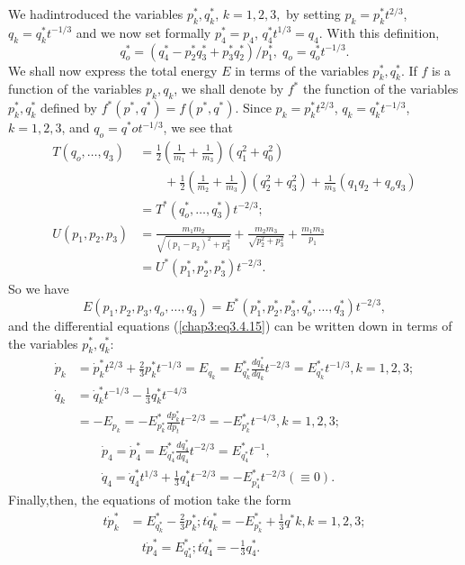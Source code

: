 We had\pageoriginale introduced the variables $p^*_k, q^*_k$, $k
=1,2,3,$ by setting $p_k = p^*_k t^{2/3}$, $q_k = q^*_k t^{-1/3}$ and
we now set formally $p^*_4 = p_4$, $q^*_4 t^{1/3} = q_4$. With this
definition, 
$$
q^*_o = (q^*_4 - p^*_2 q^*_3 + p^*_3 q^*_2) / p^*_1, \; q_o = q^*_o t^{-1/3}. 
$$
We shall now express the total energy $E$ in terms of the variables
$p^*_k, q^*_k$. If $f$ is a function of the variables $p_k, q_k$, we
shall denote by $f^*$ the function of the variables $p^*_k, q^*_k$
defined by $f^*(p^*, q^*) =  f (p^*, q^*)$. Since $p_k = p^*_k
t^{2/3}$, $q_k = q^*_k t^{-1/3}$, $k = 1,2,3$, and $q_o = q^*o
t^{-1/3}$, we see that 
\begin{align*}
T(q_o, \ldots, q_3) & = \frac{1}{2} (\frac{1}{m_1} + \frac{1}{m_3})
(q^2_1 + q^2_0)\\ 
&\qquad + \frac{1}{2}  (\frac{1}{m_2} + \frac{1}{m_3}) (q^2_2 + q^2_3)
+ \frac{1}{m_3} (q_1 q_2+ q_o q_3)\\ 
& = T^* (q^*_o, \ldots, q^*_3) t^{-2/3};\\
U (p_1, p_2, p_3) & = \frac{m_1 m_2}{\sqrt{(p_1- p_2)^2 + p^2_3 }} +
\frac{m_2 m_3}{\sqrt{p^2_2+ p^2_3}} + \frac{m_1 m_3}{p_1}\\ 
&= U^* (p^*_1, p^*_2, p^*_3) t^{-2/3}.
\end{align*}
So we have
\begin{equation*}
E (p_1, p_2, p_3, q_o , \ldots, q_3) = E^* (p^*_1, p^*_2, p^*_3,q^*_o,
\ldots , q^*_3) t^{-2/3} , \tag{3.4.32}\label{chap3:eq3.4.32} 
\end{equation*}
and the differential equations (\ref{chap3:eq3.4.15}) can be written
down in terms of the variables $p^*_k, q^*_k$: 
\begin{align*}
\dot{p}_k & = \dot{p}^*_k t^{2/3} + \frac{2}{3} p^*_k t^{-1/3} =
E_{q_k} = E^*_{q^*_k} \frac{dq^*_k}{dq_k} t^{-2/3} = E^*_{q^*_k}
t^{-1/3}, k = 1,2,3;\\ 
\dot{q}_k & = \dot{q}^*_k t^{-1/3} -\frac{1}{3} q^*_k t^{-4/3}\\ 
&= - E_{p_k} = - E^*_{p^*_k} \frac{dp^*_k}{dp_t} t^{-2/3} = -
E^*_{p^*_k} t^{-4/3}, k = 1,2,3;\\ 
& \qquad \dot{p}_4 = \dot{p}^*_4 = E^*_{q^*_4} \frac{dq^*_4}{dq_4}
t^{-2/3} = E^*_{q^*_4} t^{-1},  \\ 
& \qquad \dot{q}_4 = \dot{q}^*_4 t^{1/3} + \frac{1}{3} q^*_4 t^{-2/3}
= - E^*_{p^*_4} t^{-2/3} (\equiv 0). 
\end{align*}
Finally,\pageoriginale then, the equations of motion take the form
\begin{align*}
t\dot{p}^*_k & = E^*_{q^*_k} - \frac{2}{3} p^*_k ; t \dot{q}^*_k = -
E^*_{p^*_k} + \frac{1}{3} q^*k, k = 1,2,3; \\ 
& \quad t \dot{p}^*_4 = E^*_{q^*_4}; t \dot{q}^*_4 = - \frac{1}{3}
q^*_4. \tag{3.4.33}\label{chap3:eq3.4.33} 
\end{align*}
